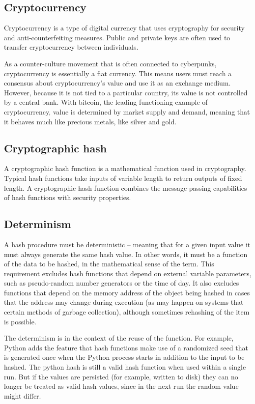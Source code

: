 \documentclass{article}
\begin{document}
\subsection{Cryptocurrency}
Cryptocurrency is a type of digital currency that uses cryptography for
security and anti-counterfeiting measures. Public and private keys are often
used to transfer cryptocurrency between individuals.

As a counter-culture movement that is often connected to cyberpunks,
cryptocurrency is essentially a fiat currency. This means users must reach a
consensus about cryptocurrency's value and use it as an exchange medium.
However, because it is not tied to a particular country, its value is not
controlled by a central bank. With bitcoin, the leading functioning example of
cryptocurrency, value is determined by market supply and demand, meaning that
it behaves much like precious metals, like silver and gold.

\subsection{Cryptographic hash}
A cryptographic hash function is a mathematical function used in cryptography.
Typical hash functions take inputs of variable length to return outputs of
fixed length. A cryptographic hash function combines the message-passing
capabilities of hash functions with security properties.

\subsection{Determinism}
A hash procedure must be deterministic -- meaning that for a given input value
it must always generate the same hash value. In other words, it must be a
function of the data to be hashed, in the mathematical sense of the term. This
requirement excludes hash functions that depend on external variable
parameters, such as pseudo-random number generators or the time of day. It
also excludes functions that depend on the memory address of the object being
hashed in cases that the address may change during execution (as may happen
on systems that certain methods of garbage collection), although sometimes
rehashing of the item is possible.

The determinism is in the context of the reuse of the function. For example,
Python adds the feature that hash functions make use of a randomized seed that
is generated once when the Python process starts in addition to the input to
be hashed. The python hash is still a valid hash function when used within a
single run. But if the values are persisted (for example, written to disk)
they can no longer be treated as valid hash values, since in the next run the
random value might differ.
\end{document}
